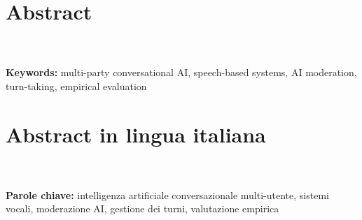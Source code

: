 \documentclass{Configuration_Files/PoliMi3i_thesis}
\begin{document}


\pagestyle{empty}
\frontmatter


\startpreamble
\setcounter{page}{1}

\chapter*{Abstract}
\\
\\
\textbf{Keywords:} multi-party conversational AI, speech-based systems, AI moderation, turn-taking, empirical evaluation %

\chapter*{Abstract in lingua italiana}
\\
\\
\textbf{Parole chiave:} intelligenza artificiale conversazionale multi-utente, sistemi vocali, moderazione AI, gestione dei turni, valutazione empirica %

\end{document}
